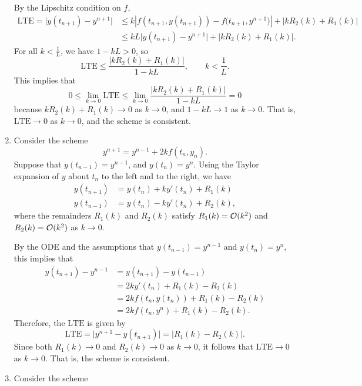 \documentclass{homework}
\begin{document}
\begin{enumerate}
		By the Lipschitz condition on $f$,
		\begin{align*}
			\text{LTE} = \big|y(t_{n+1})-y^{n+1}\big| &\le k\left|f(t_{n+1},y(t_{n+1})) - f\big(t_{n+1},y^{n+1}\big)\right| + |kR_2(k) + R_1(k)|\\
			&\le kL\big|y(t_{n+1})-y^{n+1}\big| + |kR_2(k) + R_1(k)|.
		\end{align*}
		For all $k < \frac{1}{L}$, we have $1-kL > 0$, so
		\begin{equation*}
			\text{LTE} \le \frac{|kR_2(k) + R_1(k)|}{1-kL}, \qquad k < \frac{1}{L}.
		\end{equation*}
		This implies that
		\begin{equation*}
			0 \le \lim_{k\to 0}\text{LTE} \le \lim_{k\to0}\frac{|kR_2(k) + R_1(k)|}{1-kL} = 0
		\end{equation*}
		because $kR_2(k) + R_1(k) \to 0$ as $k \to 0$, and $1-kL \to 1$ as $k\to 0$. That is, $\text{LTE} \to 0$ as $k\to0$, and the scheme is consistent.
		
		\item Consider the scheme
		\begin{equation}
			y^{n+1} = y^{n-1} + 2kf(t_n, y_n).
		\end{equation}
		Suppose that $y(t_{n-1}) = y^{n-1}$, and $y(t_n) = y^n$. Using the Taylor expansion of $y$ about $t_n$ to the left and to the right, we have
		\begin{align*}
			y(t_{n+1}) &= y(t_n) + ky'(t_n) + R_1(k) \\
			y(t_{n-1}) &= y(t_n) - ky'(t_n) + R_2(k),
		\end{align*}
		where the remainders $R_1(k)$ and $R_2(k)$ satisfy $R_1(k) = \mathcal{O}(k^2)$ and $R_2(k) = \mathcal{O}(k^2)$ as $k \to 0$.
		
		By the ODE and the assumptions that $y(t_{n-1}) = y^{n-1}$ and $y(t_n) = y^n$, this implies that
		\begin{align*}
			y(t_{n+1}) - y^{n-1} &= y(t_{n+1}) -y(t_{n-1}) \\
			&= 2ky'(t_n) +R_1(k) - R_2(k) \\
			&= 2kf(t_n, y(t_n)) + R_1(k) - R_2(k) \\
			&= 2kf(t_n, y^n) + R_1(k) - R_2(k).
		\end{align*}
		Therefore, the $\text{LTE}$ is given by
		\begin{equation*}
			\text{LTE} = \big|y^{n+1} - y(t_{n+1})\big| = |R_1(k) - R_2(k)|.
		\end{equation*}
		Since both $R_1(k) \to 0$ and $R_2(k) \to 0$ as $k\to 0$, it follows that $\text{LTE}\to 0$ as $k\to0$. That is, the scheme is consistent.
		
		\item Consider the scheme
		\begin{equation}
			
		\end{equation}
	\end{enumerate}
	
\end{document}
